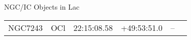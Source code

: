 \begin{block}{NGC/IC Objects in Lac}
  \centering
  \begin{tabularx}{\textwidth}{llrrll} 
    NGC7243 & OCl & 22:15:08.58 & +49:53:51.0  & -- \\ 
  \end{tabularx}
\end{block}